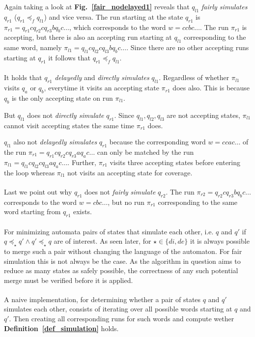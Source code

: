 \documentclass[12pt,oneside,bibliography=totoc,abstracton]{scrartcl}
\newcommand{\figref}[1]{\textbf{Fig.~\ref{#1}}}
\newcommand{\defref}[1]{\textbf{Definition~\ref{#1}}}
\begin{document}
Again taking a look at \figref{fair_nodelayed1} reveals that $q_{l1}$ \textit{fairly simulates} $q_{r1}$
($q_{r1} \preceq_f q_{l1}$) and vice versa.
The run starting at the state $q_{r1}$ is $\pi_{r1} = q_{r1}cq_{r2}cq_{r3}bq_bc \ldots$, which corresponds
to the word $w = ccbc \ldots$. The run $\pi_{r1}$ is accepting, but there is also an accepting run
starting at $q_{l1}$ corresponding to the same word, namely $\pi_{l1} = q_{l1}cq_{l2}cq_{l3}bq_bc \ldots$.
Since there are no other accepting runs starting at $q_{r1}$ it follows that $q_{r1} \preceq_f q_{l1}$.\\\\
It holds that $q_{r1}$ \textit{delayedly} and \textit{directly simulates} $q_{l1}$. Regardless of whether $\pi_{l1}$
visits $q_a$ or $q_b$, everytime it visits an accepting state $\pi_{r1}$ does also. This is because $q_b$ is the only accepting
state on run $\pi_{l1}$.

But $q_{l1}$ does not \textit{directly simulate} $q_{r1}$. Since $q_{l1}, q_{l2}, q_{l3}$ are not accepting states,
$\pi_{l1}$ cannot visit accepting states the same time $\pi_{r1}$ does.

$q_{l1}$ also not \textit{delayedly simulates} $q_{r1}$ because the corresponding word
$w = ccac \ldots$ of the run $\pi_{r1} = q_{r1}cq_{r2}cq_{r3}aq_ac \ldots$
can only be matched by the run $\pi_{l1} = q_{l1}cq_{l2}cq_{l3}aq_ac \ldots$.
Further, $\pi_{r1}$ visits three accepting states before entering the loop whereas
$\pi_{l1}$ not visits an accepting state for coverage.\\\\
Last we point out why $q_{r1}$ does not \textit{fairly simulate} $q_{r2}$.
The run $\pi_{r2} = q_{r2}cq_{r3}bq_bc \ldots$ corresponds to the word $w = cbc \ldots$,
but no run $\pi_{r1}$ corresponding to the same word starting from $q_{r1}$ exists.\\\\
For minimizing automata pairs of states that simulate each other, i.e. $q$ and
$q'$ if $q \preceq_{\star} q' \land q' \preceq_{\star} q$ are of interest. As seen later, for $\star \in \{di, de\}$ it is
always possible to merge such a pair without changing the language of the automaton.
For fair simulation this is not always be the case. As the algorithm in question aims to
reduce as many states as safely possible, the correctness of any such potential merge
must be verified before it is applied.\\\\
A naive implementation, for determining whether a pair of states $q$ and $q'$ simulates each other, consists
of iterating over all possible words starting at $q$ and $q'$. Then creating all corresponding runs for such
words and compute wether \defref{def_simulation} holds.
\end{document}
